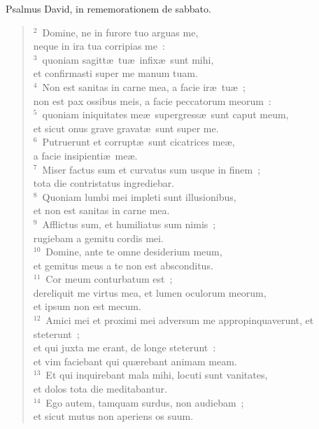 \bchapter
\lettrine[lines=3,image=true,loversize=0.05,lraise=-0.03]{P}{}salmus David, in rememorationem de sabbato.
\begin{flushleft}\begin{verse}\vspace{6pt}${}^{2}$~Domine, ne in furore tuo arguas me,\\ neque in ira tua corripias me~:\\
${}^{3}$~quoniam sagitt\ae\ tu\ae\ infix\ae\ sunt mihi,\\ et confirmasti super me manum tuam.\\
${}^{4}$~Non est sanitas in carne mea, a facie ir\ae\ tu\ae~;\\ non est pax ossibus meis, a facie peccatorum meorum~:\\
${}^{5}$~quoniam iniquitates me\ae\ supergress\ae\ sunt caput meum,\\ et sicut onus grave gravat\ae\ sunt super me.\\
${}^{6}$~Putruerunt et corrupt\ae\ sunt cicatrices me\ae ,\\ a facie insipienti\ae\ me\ae .\\
${}^{7}$~Miser factus sum et curvatus sum usque in finem~;\\ tota die contristatus ingrediebar.\\
${}^{8}$~Quoniam lumbi mei impleti sunt illusionibus,\\ et non est sanitas in carne mea.\\
${}^{9}$~Afflictus sum, et humiliatus sum nimis~;\\ rugiebam a gemitu cordis mei.\\
${}^{10}$~Domine, ante te omne desiderium meum,\\ et gemitus meus a te non est absconditus.\\
${}^{11}$~Cor meum conturbatum est~;\\ dereliquit me virtus mea, et lumen oculorum meorum,\\ et ipsum non est mecum.\\
${}^{12}$~Amici mei et proximi mei adversum me appropinquaverunt, et steterunt~;\\ et qui juxta me erant, de longe steterunt~:\\ et vim faciebant qui qu\ae rebant animam meam.\\
${}^{13}$~Et qui inquirebant mala mihi, locuti sunt vanitates,\\ et dolos tota die meditabantur.\\
${}^{14}$~Ego autem, tamquam surdus, non audiebam~;\\ et sicut mutus non aperiens os suum.\\

\end{verse}
\end{flushleft}
